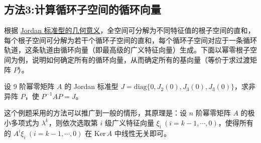 \documentclass[../../main.tex]{subfiles}%
\begin{document}
\subsection{方法3:计算循环子空间的循环向量}

根据 \hyperref[theorem:Jordan标准型的几何意义]{Jordan 标准型的几何意义}，全空间可分解为不同特征值的根子空间的直和，每个根子空间可分解为若干个循环子空间的直和，每个循环子空间对应于一条循环轨道，这条轨道由循环向量（即最高级的广义特征向量）生成。下面以幂零根子空间为例，说明如何确定所有的循环向量，从而确定所有的基向量（等价于求过渡矩阵 $P$）。

\vspace{0.5cm}

\begin{example}
设 9 阶幂零矩阵 $A$ 的 Jordan 标准型 $J = \mathrm{diag}\{0,J_2(0),J_3(0),J_3(0)\}$，求非异阵 $P$，使 $P^{-1}AP = J$。
\end{example}
\begin{remark}
这个例题采用的方法可以推广到一般的情形，其原理是：设 $n$ 阶幂零矩阵 $A$ 的极小多项式为 $\lambda^k$，则依次选取第 $i$ 级广义特征向量 $\xi_i\ (i = k - 1,\cdots,0)$，使得所有的 $A^i\xi_i\ (i = k - 1,\cdots,0)$ 在 $\mathrm{Ker}\,A$ 中线性无关即可。
\end{remark}
\end{document}
